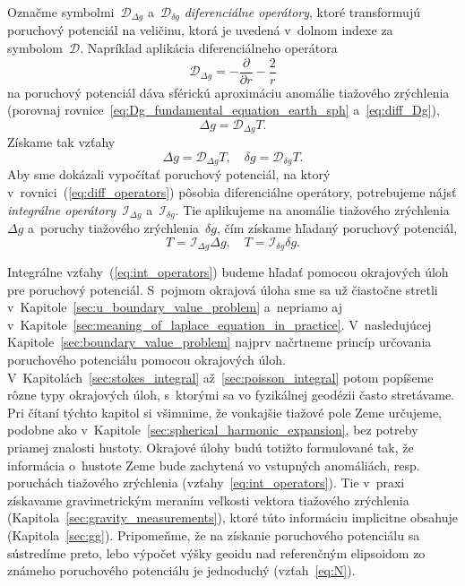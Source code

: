 \documentclass[a4paper,12pt]{book}
\newcommand{\DIFF}{\mathcal D}
\newcommand{\INT}{\mathcal I}
\begin{document}
Označme symbolmi~$\DIFF_{\Delta g}$ a~$\DIFF_{\delta g}$ \emph{diferenciálne 
operátory}, ktoré transformujú poruchový potenciál na veličinu, ktorá je 
uvedená v~dolnom indexe za symbolom~$\DIFF$.  Napríklad aplikácia 
diferenciálneho operátora
%
\begin{equation}
\label{eq:diff_Dg}
\DIFF_{\Delta g} = -\frac{\partial}{\partial r} - \frac{2}{r}
\end{equation}
%
na poruchový potenciál dáva sférickú aproximáciu anomálie tiažového zrýchlenia 
(porovnaj rovnice~\ref{eq:Dg_fundamental_equation_earth_sph} 
a~\ref{eq:diff_Dg}),
%
\begin{equation}
\Delta g = \DIFF_{\Delta g} T{.}
\end{equation}
%
Získame tak vzťahy
%
\begin{equation}
\label{eq:diff_operators}
\Delta g = \DIFF_{\Delta g}T{,} \quad \delta g = \DIFF_{\delta g}T{.}
\end{equation}
%
Aby sme dokázali vypočítať poruchový potenciál, na ktorý 
v~rovnici~(\ref{eq:diff_operators}) pôsobia diferenciálne operátory, 
potrebujeme nájsť \emph{integrálne operátory}~$\INT_{\Delta g}$ a~$\INT_{\delta 
g}$.  Tie aplikujeme na anomálie tiažového zrýchlenia~$\Delta g$ a~poruchy 
tiažového zrýchlenia~$\delta g$, čím získame hľadaný poruchový potenciál,
%
\begin{equation}
\label{eq:int_operators}
T = \INT_{\Delta g} \Delta g{,} \quad T = \INT_{\delta g}\delta g{.}
\end{equation}

Integrálne vzťahy~(\ref{eq:int_operators}) budeme hľadať pomocou okrajových 
úloh pre poruchový potenciál.  S~pojmom okrajová úloha sme sa už čiastočne 
stretli v~Kapitole~\ref{sec:u_boundary_value_problem} a~nepriamo aj 
v~Kapitole~\ref{sec:meaning_of_laplace_equation_in_practice}.  V~nasledujúcej 
Kapitole~\ref{sec:boundary_value_problem} najprv načrtneme princíp určovania 
poruchového potenciálu pomocou okrajových úloh.  
V~Kapitolách~\ref{sec:stokes_integral} až~\ref{sec:poisson_integral} potom 
popíšeme rôzne typy okrajových úloh, s~ktorými sa vo fyzikálnej geodézii často 
stretávame.  Pri čítaní týchto kapitol si všimnime, že vonkajšie tiažové pole 
Zeme určujeme, podobne ako v~Kapitole~\ref{sec:spherical_harmonic_expansion}, 
bez potreby priamej znalosti hustoty.  Okrajové úlohy budú totižto formulované 
tak, že informácia o~hustote Zeme bude zachytená vo vstupných anomáliách, 
resp. poruchách tiažového zrýchlenia (vzťahy~\ref{eq:int_operators}).  Tie 
v~praxi získavame gravimetrickým meraním veľkosti vektora tiažového zrýchlenia 
(Kapitola~\ref{sec:gravity_measurements}), ktoré túto informáciu implicitne 
obsahuje (Kapitola~\ref{sec:gg}).  Pripomeňme, že na získanie poruchového 
potenciálu sa sústredíme preto, lebo výpočet výšky geoidu nad referenčným 
elipsoidom zo známeho poruchového potenciálu je jednoduchý (vzťah~\ref{eq:N}).
\end{document}
